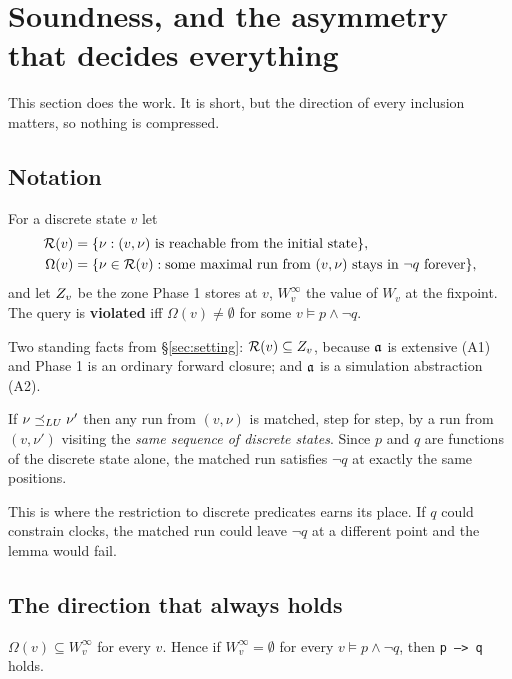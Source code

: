 \section{Soundness, and the asymmetry that decides everything}
\label{sec:soundness}

This section does the work. It is short, but the direction of every inclusion matters, so nothing
is compressed.

\subsection{Notation}

For a discrete state $v$ let
\begin{align*}
  \mathcal{R}(v) &= \{\nu : (v,\nu) \text{ is reachable from the initial state}\}, \\
  \Omega(v) &= \{\nu \in \mathcal{R}(v) : \text{some maximal run from } (v,\nu) \text{ stays in } \lnot q \text{ forever}\},
\end{align*}
and let $Z_v$ be the zone Phase 1 stores at $v$, $W_v^\infty$ the value of $W_v$ at the fixpoint.
The query is \textbf{violated} iff $\Omega(v) \neq \emptyset$ for some $v \models p \wedge \lnot q$.

Two standing facts from \S\ref{sec:setting}: $\mathcal{R}(v) \subseteq Z_v$, because $\mathfrak{a}$ is
extensive (A1) and Phase 1 is an ordinary forward closure; and $\mathfrak{a}$ is a simulation
abstraction (A2).

\begin{lemma}
\label{lem:disc-pred}
If $\nu \preceq_{LU} \nu'$ then any run from $(v,\nu)$ is matched, step for step, by a run from
$(v,\nu')$ visiting the \emph{same sequence of discrete states}. Since $p$ and $q$ are functions of
the discrete state alone, the matched run satisfies $\lnot q$ at exactly the same positions. \proved{}
\end{lemma}

This is where the restriction to discrete predicates earns its place. If $q$ could constrain clocks,
the matched run could leave $\lnot q$ at a different point and the lemma would fail.

\subsection{The direction that always holds}

\begin{theorem}
\label{thm:sound-holds}
$\Omega(v) \subseteq W_v^\infty$ for every $v$. Hence if $W_v^\infty = \emptyset$ for every
$v \models p \wedge \lnot q$, then \texttt{p --> q} holds. \proved{}
\end{theorem}

